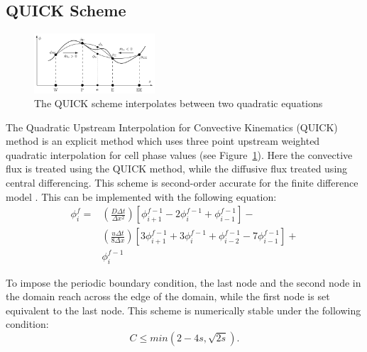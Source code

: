 \documentclass[twocolumn,10pt]{asme2ej}
\begin{document}
\subsection{QUICK Scheme}

\begin{figure}[tbh]
\begin{center}
\includegraphics[width=0.4\textwidth]{figure/QUICK.png}
\caption{The QUICK scheme interpolates between two quadratic equations \cite{analytic_citation}}
\label{QUICK_scheme}
\end{center}
\end{figure}

The Quadratic Upstream Interpolation for Convective Kinematics (QUICK) method is an explicit method which uses three point upstream weighted quadratic interpolation for cell phase values (see Figure~\ref{QUICK_scheme}). Here the convective flux is treated using the QUICK method, while the diffusive flux treated using central differencing. This scheme is second-order accurate for the finite difference model \cite{chen1992advection}. This can be implemented with the following equation:
\begin{equation}
\label{quick_eqn}
\begin{split}
\phi_i ^f = & \left( \frac{D \Delta t}{\Delta x^2} \right) \left[ \phi_{i+1} ^{f-1} - 2 \phi_{i} ^{f-1} + \phi_{i-1} ^{f-1} \right] - \\
            & \left( \frac{u \Delta t}{8 \Delta x} \right) \left[ 3 \phi_{i+1} ^{f-1}  + 3 \phi_{i} ^{f-1}  + \phi_{i-2} ^{f-1} - 7 \phi_{i-1} ^{f-1} \right] + \\
            & \phi_i ^{f-1}
\end{split}
\end{equation}

To impose the periodic boundary condition, the last node and the second node in the domain reach across the edge of the domain, while the first node is set equivalent to the last node. This scheme is numerically stable under the following condition:
\begin{equation}
\label{QUICK_stability}
C \leq min(2 - 4 s, \sqrt{2s}).
\end{equation}
\end{document}
